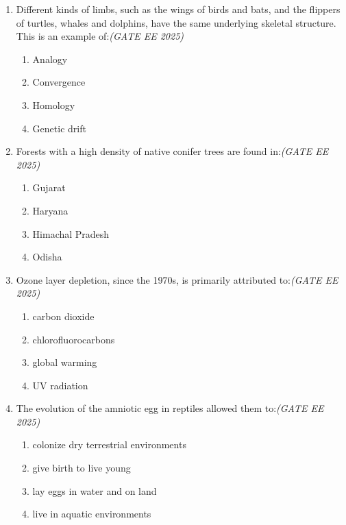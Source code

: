\documentclass[11pt,a4paper]{article}
\begin{document}
\begin{enumerate}[leftmargin=*,label=\textbf{Q.\arabic*}]

\item Different kinds of limbs, such as the wings of birds and bats, and the flippers of turtles, whales and dolphins, have the same underlying skeletal structure. This is an example of:\hfill \textit{(GATE EE 2025)}
\begin{multicols}{2}
\begin{enumerate}[label=(\Alph*)]
\item Analogy
\item Convergence
\item Homology
\item Genetic drift
\end{enumerate}
\end{multicols}

\item Forests with a high density of native conifer trees are found in:\hfill \textit{(GATE EE 2025)}
\begin{multicols}{2}
\begin{enumerate}[label=(\Alph*)]
\item Gujarat
\item Haryana
\item Himachal Pradesh
\item Odisha
\end{enumerate}
\end{multicols}

\item Ozone layer depletion, since the 1970s, is primarily attributed to:\hfill \textit{(GATE EE 2025)}
\begin{multicols}{2}
\begin{enumerate}[label=(\Alph*)]
\item carbon dioxide
\item chlorofluorocarbons
\item global warming
\item UV radiation
\end{enumerate}
\end{multicols}

\item The evolution of the amniotic egg in reptiles allowed them to:\hfill \textit{(GATE EE 2025)}
\begin{multicols}{2}
\begin{enumerate}[label=(\Alph*)]
\item colonize dry terrestrial environments
\item give birth to live young
\item lay eggs in water and on land
\item live in aquatic environments
\end{enumerate}
\end{multicols}


\end{enumerate}
\end{document}
